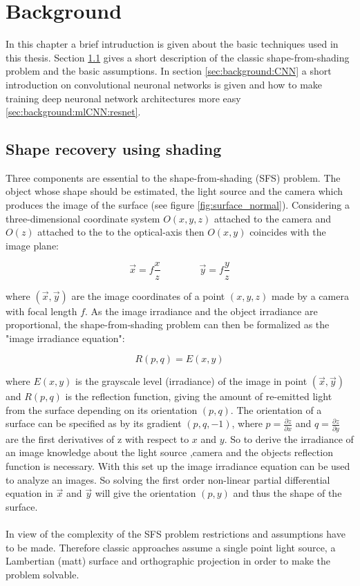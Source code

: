 \chapter{Background}
	In this chapter a brief intruduction is given about the basic techniques used in this thesis.
	Section \ref{sec:background:SFS} gives a short description of the classic shape-from-shading problem and the basic assumptions. In section \ref{sec:background:CNN} a short introduction on convolutional neuronal networks  is given and how to make training deep neuronal network architectures more easy \ref{sec:background:mlCNN:resnet}.
	
\section{Shape recovery using shading}
\label{sec:background:SFS}
	Three components are essential to the shape-from-shading (SFS) problem. The object whose shape should be estimated, the light source and the camera which produces the image of the surface  (see figure \ref{fig:surface_normal}). Considering a three-dimensional coordinate system $O(x,y,z)$ attached to the camera and $O(z)$  attached to the to the optical-axis then $O(x,y)$ coincides with the image plane:
	
	\begin{equation}
		\vec{x} = f \frac{x}{z}
		\quad \quad \quad  \quad 
		\vec{y} = f \frac{y}{z}
	\end{equation}
	
	where $(\vec{x},\vec{y})$ are the image coordinates of a point $(x,y,z)$ made by a camera with focal length $f$. 	
	As the image irradiance and the object irradiance are proportional, the shape-from-shading problem can then be formalized as the "image irradiance equation":
	
	\begin{equation}
	\label{eq:img_irradiance}
	R(p,q) = E(x,y)
	\end{equation}
	
	where $E(x,y)$ is the grayscale level (irradiance) of the image in point $(\vec{x},\vec{y})$ and $R(p,q)$ is the reflection function, giving the amount of re-emitted light from the surface depending on its orientation $(p,q)$. The orientation of a surface can be specified as by its gradient $(p,q,-1)$, where $p = \frac{\partial z}{\partial x}$ and $q = \frac{\partial z}{\partial y}$ are the first derivatives of z with respect to $x$ and $y$. So to derive the irradiance of an image knowledge about the light source ,camera and the objects reflection function is necessary. 
	With this set up the image irradiance equation can be used to analyze an images. So solving the first order non-linear partial differential equation in $\vec{x}$ and $\vec{y}$ will give the orientation $(p,y)$ and thus the shape of the surface. 
	\\ \\
	In view of the complexity of the SFS problem restrictions and assumptions have to be made. Therefore classic approaches assume a single point light source, a Lambertian (matt) surface and orthographic projection in order to make the problem solvable.	

